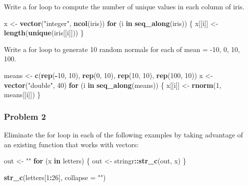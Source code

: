 \documentclass[]{article}
\newenvironment{Shaded}{\begin{snugshade}}{\end{snugshade}}
\newcommand{\KeywordTok}[1]{\textcolor[rgb]{0.13,0.29,0.53}{\textbf{#1}}}
\newcommand{\DataTypeTok}[1]{\textcolor[rgb]{0.13,0.29,0.53}{#1}}
\newcommand{\DecValTok}[1]{\textcolor[rgb]{0.00,0.00,0.81}{#1}}
\newcommand{\StringTok}[1]{\textcolor[rgb]{0.31,0.60,0.02}{#1}}
\newcommand{\ControlFlowTok}[1]{\textcolor[rgb]{0.13,0.29,0.53}{\textbf{#1}}}
\newcommand{\OperatorTok}[1]{\textcolor[rgb]{0.81,0.36,0.00}{\textbf{#1}}}
\newcommand{\NormalTok}[1]{#1}
\begin{document}
Write a for loop to compute the number of unique values in each column
of iris.

\begin{Shaded}
\begin{Highlighting}[]
\NormalTok{x <-}\StringTok{ }\KeywordTok{vector}\NormalTok{(}\StringTok{"integer"}\NormalTok{, }\KeywordTok{ncol}\NormalTok{(iris))}
\ControlFlowTok{for}\NormalTok{ (i }\ControlFlowTok{in} \KeywordTok{seq_along}\NormalTok{(iris)) \{}
\NormalTok{  x[[i]] <-}\StringTok{ }\KeywordTok{length}\NormalTok{(}\KeywordTok{unique}\NormalTok{(iris[[i]]))}
\NormalTok{\}}
\end{Highlighting}
\end{Shaded}

Write a for loop to generate 10 random normals for each of mean = -10,
0, 10, 100.

\begin{Shaded}
\begin{Highlighting}[]
\NormalTok{means <-}\StringTok{ }\KeywordTok{c}\NormalTok{(}\KeywordTok{rep}\NormalTok{(}\OperatorTok{-}\DecValTok{10}\NormalTok{, }\DecValTok{10}\NormalTok{), }\KeywordTok{rep}\NormalTok{(}\DecValTok{0}\NormalTok{, }\DecValTok{10}\NormalTok{), }\KeywordTok{rep}\NormalTok{(}\DecValTok{10}\NormalTok{, }\DecValTok{10}\NormalTok{), }\KeywordTok{rep}\NormalTok{(}\DecValTok{100}\NormalTok{, }\DecValTok{10}\NormalTok{))}
\NormalTok{x <-}\StringTok{ }\KeywordTok{vector}\NormalTok{(}\StringTok{"double"}\NormalTok{, }\DecValTok{40}\NormalTok{)}
\ControlFlowTok{for}\NormalTok{ (i }\ControlFlowTok{in} \KeywordTok{seq_along}\NormalTok{(means)) \{}
\NormalTok{  x[[i]] <-}\StringTok{ }\KeywordTok{rnorm}\NormalTok{(}\DecValTok{1}\NormalTok{, means[[i]])}
\NormalTok{\}}
\end{Highlighting}
\end{Shaded}

\subsubsection*{Problem 2}\label{problem-2}

Eliminate the for loop in each of the following examples by taking
advantage of an existing function that works with vectors:

\begin{Shaded}
\begin{Highlighting}[]
\NormalTok{out <-}\StringTok{ ""}
\ControlFlowTok{for}\NormalTok{ (x }\ControlFlowTok{in}\NormalTok{ letters) \{}
\NormalTok{  out <-}\StringTok{ }\NormalTok{stringr}\OperatorTok{::}\KeywordTok{str_c}\NormalTok{(out, x)}
\NormalTok{\}}

\KeywordTok{str_c}\NormalTok{(letters[}\DecValTok{1}\OperatorTok{:}\DecValTok{26}\NormalTok{], }\DataTypeTok{collapse =} \StringTok{""}\NormalTok{)}
\end{Highlighting}
\end{Shaded}
\end{document}
